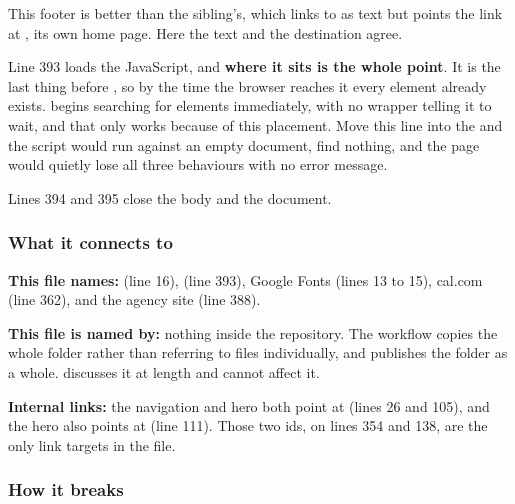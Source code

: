 This footer is better than the sibling's, which links to 
as text but points the link at \code{/}, its own home page. Here the text and the
destination agree.

Line 393 loads the JavaScript, and \textbf{where it sits is the whole point}. It is
the last thing before , so by the time the browser reaches it every
element already exists.  begins searching for elements immediately,
with no wrapper telling it to wait, and that only works because of this placement.
Move this line into the  and the script would run against an empty
document, find nothing, and the page would quietly lose all three behaviours with
no error message.

Lines 394 and 395 close the body and the document.

\subsubsection*{What it connects to}

\textbf{This file names:}  (line 16),
 (line 393), Google Fonts (lines 13 to 15),
cal.com (line 362), and the agency site (line 388).

\textbf{This file is named by:} nothing inside the repository. The workflow copies
the whole folder rather than referring to files individually, and
 publishes the folder as a whole.  discusses it
at length and cannot affect it.

\textbf{Internal links:} the navigation and hero both point at  (lines
26 and 105), and the hero also points at  (line 111). Those two ids,
on lines 354 and 138, are the only link targets in the file.

\subsubsection*{How it breaks}

